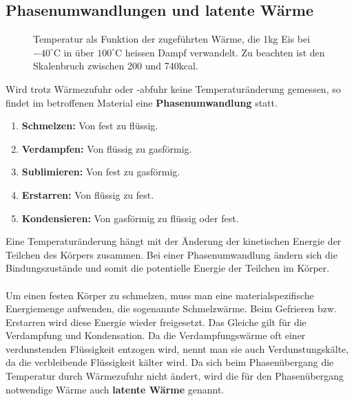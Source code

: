 \subsection{Phasenumwandlungen und latente Wärme}
\begin{figure}[H]
\centering
\caption{Temperatur als Funktion der zugeführten Wärme, die 1kg Eis bei $-40^{\circ}$C in über $100^{\circ}$C heissen Dampf verwandelt. Zu beachten ist den Skalenbruch zwischen 200 und 740kcal.}
\label{fig_Ig}
\end{figure}
Wird trotz Wärmezufuhr oder -abfuhr keine Temperaturänderung gemessen, so findet im betroffenen Material eine \textbf{Phasenumwandlung} statt.
\begin{enumerate}
\item \textbf{Schmelzen:} Von fest zu flüssig.
\item \textbf{Verdampfen:} Von flüssig zu gasförmig.
\item \textbf{Sublimieren:} Von fest zu gasförmig.
\item \textbf{Erstarren:} Von flüssig zu fest.
\item \textbf{Kondensieren:} Von gasförmig zu flüssig oder fest.
\end{enumerate}
Eine Temperaturänderung hängt mit der Änderung der kinetischen Energie der Teilchen des Körpers zusammen. Bei einer Phasenumwandlung ändern sich die Bindungszustände und somit die potentielle Energie der Teilchen im Körper.
\\\\
Um einen festen Körper zu schmelzen, muss man eine materialspezifische Energiemenge aufwenden, die sogenannte Schmelzwärme. Beim Gefrieren bzw. Erstarren wird diese Energie wieder freigesetzt. Das Gleiche gilt für die Verdampfung und Kondensation. Da die Verdampfungswärme oft einer verdunstenden Flüssigkeit entzogen wird, nennt man sie auch Verdunstungskälte, da die verbleibende Flüssigkeit kälter wird. Da sich beim Phasenübergang die Temperatur durch Wärmezufuhr nicht ändert, wird die für den Phasenübergang notwendige Wärme auch \textbf{latente Wärme} genannt. 
